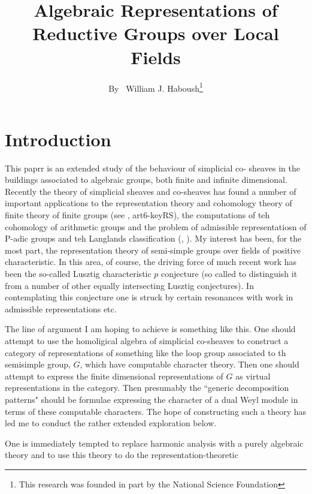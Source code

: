 \title{Algebraic Representations of Reductive Groups over Local Fields}

\author{By~ William J. Haboush\footnote{This research was founded in part by the National Science Foundation}}

\date{}
\maketitle



\section*{Introduction}

This paprr is an extended study of the behaviour of simplicial co- sheaves in the buildings associated to algebraic groups, both finite and infinite dimensional. Recently the theory of simplicial sheaves and co-sheaves has found a number of important applications to the representation theory and cohomology theory of finite theory of finite groups (see \cite{art6-keyT}, art6-keyRS), the computations of teh cohomology of arithmetic groups and the problem of admissible representatiosn of P-adic groups and teh Langlands classification (\cite{art6-keyCW}, \cite{art6-keyBW}). My interest has been, for the most part, the representation theory of semi-simple groups over fields of positive characteristic. In this area, of course, the driving force of much recent work has been the so-called Lusztig characteristic $p$ conjecture \cite{art6-keyL1} (so called to distinguish it from a number of other equally intersecting Lusztig conjectures). In contemplating this conjecture one is struck by certain resonances with work in admissible representations etc.

The line of argument I am hoping to achieve is something like this. One should attempt to use the homoligical algebra of simplicial co-sheaves to construct a category of representations of something like the loop group associated to th semisimple group, $G$, which have computable character theory. Then one should attempt to express the finite dimensional representations of $G$ as virtual representations in the category. Then presumably the ``generic decomposition patterns" should be formulae expressing the character of a dual Weyl module in terms of these computable characters. The hope of constructing such a theory has led me to conduct the rather extended exploration below.  

One is immediately tempted to replace harmonic analysis with a purely algebraic theory and to use this theory to do the representation-theoretic
